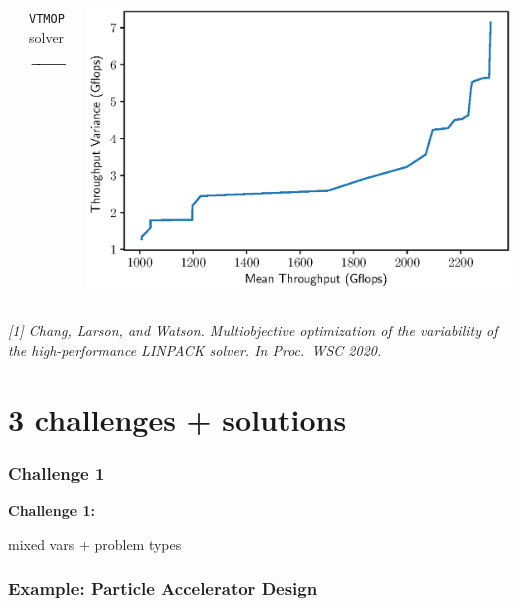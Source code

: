 \documentclass[aspectratio=169]{beamer}
\begin{document}
\begin{frame}
\begin{columns}
\begin{column}{.3\textwidth}
\begin{center}
\end{center}
\end{column}
\begin{column}{.2\textwidth}
\begin{center}
{\tt VTMOP} solver
$$\xrightarrow{\hspace*{2cm}}$$
\end{center}
\end{column}
\begin{column}{.4\textwidth}
\includegraphics[width=\textwidth]{../img/moo_old/hpl_n20k_pf.eps}
\end{column}
\end{columns}

\medskip

{\tiny\it
[1] Chang, Larson, and Watson.
Multiobjective optimization of the variability of the high-performance 
LINPACK solver.
{\sl In Proc.\ WSC 2020.}\\
}
\end{frame}

\section{3 challenges + solutions}

\begin{frame}\frametitle{Challenge 1}
\vfill
\begin{center}
{\Huge \bf
Challenge 1:\\

\bigskip

mixed vars + problem types
}
\end{center}
\vfill
\end{frame}

\begin{frame}\frametitle{Example: Particle Accelerator Design}

\end{frame}
\end{document}
